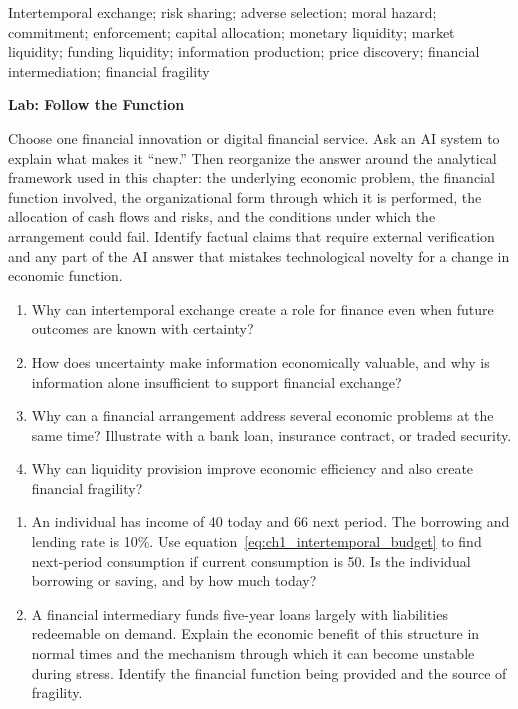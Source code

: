 
Intertemporal exchange; risk sharing;
adverse selection; moral hazard; commitment; enforcement; capital allocation;
monetary liquidity; market liquidity; funding liquidity; information production;
price discovery; financial intermediation; financial fragility


\textbf{Lab: Follow the Function}

Choose one financial innovation or digital financial service. Ask an AI
system to explain what makes it ``new.'' Then reorganize the answer around
the analytical framework used in this chapter: the underlying economic
problem, the financial function involved, the organizational form through
which it is performed, the allocation of cash flows and risks, and the
conditions under which the arrangement could fail. Identify factual claims
that require external verification and any part of the AI answer that
mistakes technological novelty for a change in economic function.


\begin{enumerate}
\item Why can intertemporal exchange create a role for finance even when future outcomes are known with certainty?
\item How does uncertainty make information economically valuable, and why is information alone insufficient to support financial exchange?
\item Why can a financial arrangement address several economic problems at the same time? Illustrate with a bank loan, insurance contract, or traded security.
\item Why can liquidity provision improve economic efficiency and also create financial fragility?
\end{enumerate}


\begin{enumerate}
\item An individual has income of 40 today and 66 next period. The borrowing and lending rate is 10\%. Use equation~\eqref{eq:ch1_intertemporal_budget} to find next-period consumption if current consumption is 50. Is the individual borrowing or saving, and by how much today?

\item A financial intermediary funds five-year loans largely with liabilities redeemable on demand. Explain the economic benefit of this structure in normal times and the mechanism through which it can become unstable during stress. Identify the financial function being provided and the source of fragility.
\end{enumerate}


